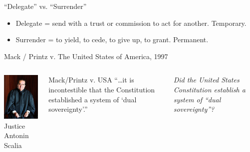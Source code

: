 
\begin{frame}{``Delegate'' vs. ``Surrender''}
    \begin{itemize}
        \item Delegate = send with a trust or commission to act for another. Temporary.
        \item Surrender = to yield, to cede, to give up, to grant. Permanent.
    \end{itemize}
\end{frame}

\begin{frame}{Mack / Printz v. The United States of America, 1997}
    \begin{columns}[onlytextwidth]
            \centering
            \includegraphics[height=0.75\textheight]{img/scalia.jpg} \\
            Justice Antonin Scalia \\

            \begin{block}{Mack/Printz v. USA}
                ``\ldots it is incontestible that the Constitution established a system of `dual sovereignty'.''
            \end{block}
            \pause
            {
                \color{red}
                \emph{Did the United States Constitution establish a system of ``dual sovereignty''?}
            }
    \end{columns}
\end{frame}

